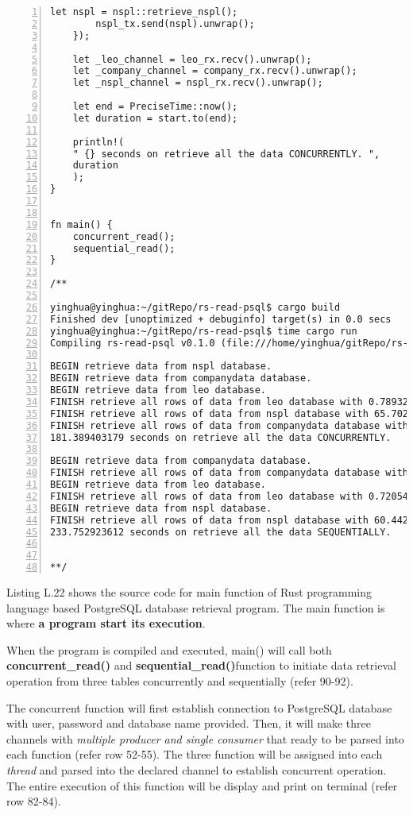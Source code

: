 \begin{lstlisting}[breaklines, frame=single, numbers=left, caption={Main function for sequential execution. (main.rs)}, label=commandline-02]
	let nspl = nspl::retrieve_nspl();
		nspl_tx.send(nspl).unwrap();
	});
	
	let _leo_channel = leo_rx.recv().unwrap();
	let _company_channel = company_rx.recv().unwrap();
	let _nspl_channel = nspl_rx.recv().unwrap();
	
	let end = PreciseTime::now();
	let duration = start.to(end);
	
	println!(
	" {} seconds on retrieve all the data CONCURRENTLY. ",
	duration
	);
}


fn main() {
	concurrent_read();
	sequential_read();
}

/** 

yinghua@yinghua:~/gitRepo/rs-read-psql$ cargo build 
Finished dev [unoptimized + debuginfo] target(s) in 0.0 secs
yinghua@yinghua:~/gitRepo/rs-read-psql$ time cargo run 
Compiling rs-read-psql v0.1.0 (file:///home/yinghua/gitRepo/rs-read-psql)

BEGIN retrieve data from nspl database. 
BEGIN retrieve data from companydata database. 
BEGIN retrieve data from leo database. 
FINISH retrieve all rows of data from leo database with 0.789323246 seconds.
FINISH retrieve all rows of data from nspl database with 65.702471599 seconds.
FINISH retrieve all rows of data from companydata database with 181.387234079 seconds.
181.389403179 seconds on retrieve all the data CONCURRENTLY.

BEGIN retrieve data from companydata database. 
FINISH retrieve all rows of data from companydata database with 172.584919465 seconds.
BEGIN retrieve data from leo database. 
FINISH retrieve all rows of data from leo database with 0.720544494 seconds.
BEGIN retrieve data from nspl database. 
FINISH retrieve all rows of data from nspl database with 60.442268738 seconds.
233.752923612 seconds on retrieve all the data SEQUENTIALLY. 


**/ 

\end{lstlisting}

Listing L.22 shows the source code for main function of Rust programming language based PostgreSQL database retrieval program. The main function is where \textbf{a program start its execution}. 

When the program is compiled and executed, main() will call both \textbf{concurrent\_read()} and \textbf{sequential\_read()}function to initiate data retrieval operation from three tables concurrently and sequentially (refer 90-92).

The concurrent function will first establish connection to PostgreSQL database with user, password and database name provided. Then, it will make three channels with \textit{multiple producer and single consumer} that ready to be parsed into each function (refer row 52-55). The three function will be assigned into each \textit{thread} and parsed into the declared channel to establish concurrent operation. The entire execution of this function  will be display and print on terminal (refer row 82-84). 

